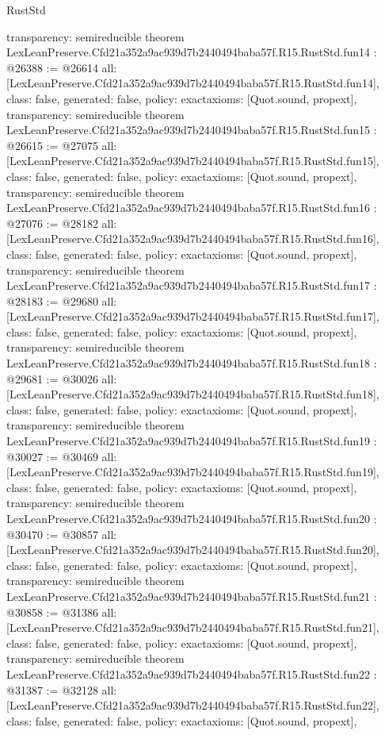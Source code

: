 \begin{lexlean}{RustStd}
\begin{coremodule}
{  transparency: semireducible
}
theorem LexLeanPreserve.Cfd21a352a9ac939d7b2440494baba57f.R15.RustStd.fun14 : @26388 := @26614 {
  all: [LexLeanPreserve.Cfd21a352a9ac939d7b2440494baba57f.R15.RustStd.fun14],
  class: false,
  generated: false,
  policy: exact{axioms: [Quot.sound, propext]},
  transparency: semireducible
}
theorem LexLeanPreserve.Cfd21a352a9ac939d7b2440494baba57f.R15.RustStd.fun15 : @26615 := @27075 {
  all: [LexLeanPreserve.Cfd21a352a9ac939d7b2440494baba57f.R15.RustStd.fun15],
  class: false,
  generated: false,
  policy: exact{axioms: [Quot.sound, propext]},
  transparency: semireducible
}
theorem LexLeanPreserve.Cfd21a352a9ac939d7b2440494baba57f.R15.RustStd.fun16 : @27076 := @28182 {
  all: [LexLeanPreserve.Cfd21a352a9ac939d7b2440494baba57f.R15.RustStd.fun16],
  class: false,
  generated: false,
  policy: exact{axioms: [Quot.sound, propext]},
  transparency: semireducible
}
theorem LexLeanPreserve.Cfd21a352a9ac939d7b2440494baba57f.R15.RustStd.fun17 : @28183 := @29680 {
  all: [LexLeanPreserve.Cfd21a352a9ac939d7b2440494baba57f.R15.RustStd.fun17],
  class: false,
  generated: false,
  policy: exact{axioms: [Quot.sound, propext]},
  transparency: semireducible
}
theorem LexLeanPreserve.Cfd21a352a9ac939d7b2440494baba57f.R15.RustStd.fun18 : @29681 := @30026 {
  all: [LexLeanPreserve.Cfd21a352a9ac939d7b2440494baba57f.R15.RustStd.fun18],
  class: false,
  generated: false,
  policy: exact{axioms: [Quot.sound, propext]},
  transparency: semireducible
}
theorem LexLeanPreserve.Cfd21a352a9ac939d7b2440494baba57f.R15.RustStd.fun19 : @30027 := @30469 {
  all: [LexLeanPreserve.Cfd21a352a9ac939d7b2440494baba57f.R15.RustStd.fun19],
  class: false,
  generated: false,
  policy: exact{axioms: [Quot.sound, propext]},
  transparency: semireducible
}
theorem LexLeanPreserve.Cfd21a352a9ac939d7b2440494baba57f.R15.RustStd.fun20 : @30470 := @30857 {
  all: [LexLeanPreserve.Cfd21a352a9ac939d7b2440494baba57f.R15.RustStd.fun20],
  class: false,
  generated: false,
  policy: exact{axioms: [Quot.sound, propext]},
  transparency: semireducible
}
theorem LexLeanPreserve.Cfd21a352a9ac939d7b2440494baba57f.R15.RustStd.fun21 : @30858 := @31386 {
  all: [LexLeanPreserve.Cfd21a352a9ac939d7b2440494baba57f.R15.RustStd.fun21],
  class: false,
  generated: false,
  policy: exact{axioms: [Quot.sound, propext]},
  transparency: semireducible
}
theorem LexLeanPreserve.Cfd21a352a9ac939d7b2440494baba57f.R15.RustStd.fun22 : @31387 := @32128 {
  all: [LexLeanPreserve.Cfd21a352a9ac939d7b2440494baba57f.R15.RustStd.fun22],
  class: false,
  generated: false,
  policy: exact{axioms: [Quot.sound, propext]},
}
\end{coremodule}
\end{lexlean}
